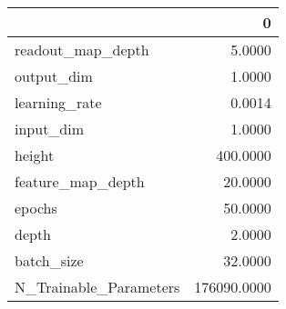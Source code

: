 \begin{tabular}{lr}
\toprule
{} &            0 \\
\midrule
readout\_map\_depth      &       5.0000 \\
output\_dim             &       1.0000 \\
learning\_rate          &       0.0014 \\
input\_dim              &       1.0000 \\
height                 &     400.0000 \\
feature\_map\_depth      &      20.0000 \\
epochs                 &      50.0000 \\
depth                  &       2.0000 \\
batch\_size             &      32.0000 \\
N\_Trainable\_Parameters &  176090.0000 \\
\bottomrule
\end{tabular}
